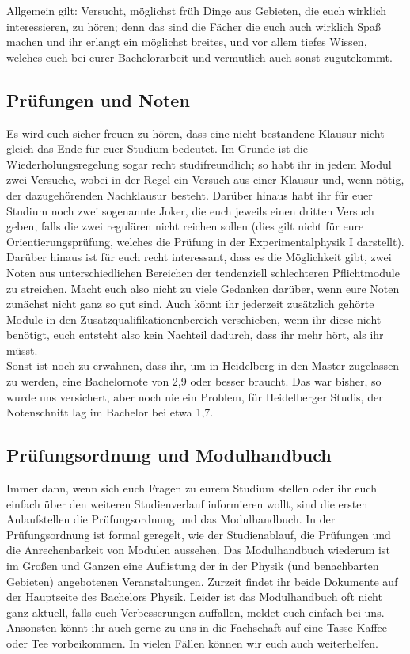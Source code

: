 Allgemein gilt: Versucht, möglichst früh Dinge aus Gebieten, die euch wirklich interessieren, zu hören; denn das sind die Fächer die euch auch wirklich Spaß machen und ihr erlangt ein möglichst breites, und vor allem tiefes Wissen, welches euch bei eurer Bachelorarbeit und vermutlich auch sonst zugutekommt.

\subsection{Prüfungen und Noten}

Es wird euch sicher freuen zu hören, dass eine nicht bestandene Klausur nicht gleich das Ende für euer Studium bedeutet. Im Grunde ist die Wiederholungsregelung sogar recht studifreundlich; so habt ihr in jedem Modul zwei Versuche, wobei in der Regel ein Versuch aus einer Klausur und, wenn nötig, der dazugehörenden Nachklausur besteht. Darüber hinaus habt ihr für euer Studium noch zwei sogenannte Joker, die euch jeweils einen dritten Versuch geben, falls die zwei regulären nicht reichen sollen (dies gilt nicht für eure Orientierungsprüfung, welches die Prüfung in der Experimentalphysik I darstellt). Darüber hinaus ist für euch recht interessant, dass es die Möglichkeit gibt, zwei Noten aus unterschiedlichen Bereichen der tendenziell schlechteren Pflichtmodule zu streichen. Macht euch also nicht zu viele Gedanken darüber, wenn eure Noten zunächst nicht ganz so gut sind. Auch könnt ihr jederzeit zusätzlich gehörte Module in den Zusatzqualifikationenbereich verschieben, wenn ihr diese nicht benötigt, euch entsteht also kein Nachteil dadurch, dass ihr mehr hört, als ihr müsst.\\

Sonst ist noch zu erwähnen, dass ihr, um in Heidelberg in den Master zugelassen zu werden, eine Bachelornote von 2,9 oder besser braucht. Das war bisher, so wurde uns versichert, aber noch nie ein Problem, für Heidelberger Studis, der Notenschnitt lag im Bachelor bei etwa 1,7.

\subsection{Prüfungsordnung und Modulhandbuch}

Immer dann, wenn sich euch Fragen zu eurem Studium stellen oder ihr euch einfach über den weiteren Studienverlauf informieren wollt, sind die ersten Anlaufstellen die Prüfungsordnung und das Modulhandbuch. In der Prüfungsordnung ist formal geregelt, wie der Studienablauf, die Prüfungen und die Anrechenbarkeit von Modulen aussehen. Das Modulhandbuch wiederum ist im Großen und Ganzen eine Auflistung der in der Physik (und benachbarten Gebieten) angebotenen Veranstaltungen. Zurzeit findet ihr beide Dokumente auf der Hauptseite des Bachelors Physik. Leider ist das Modulhandbuch oft nicht ganz aktuell, falls euch Verbesserungen auffallen, meldet euch einfach bei uns.\\

Ansonsten könnt ihr auch gerne zu uns in die Fachschaft auf eine Tasse Kaffee oder Tee vorbeikommen. In vielen Fällen können wir euch auch weiterhelfen.

\begin{figure}[hbt]
\end{figure}
